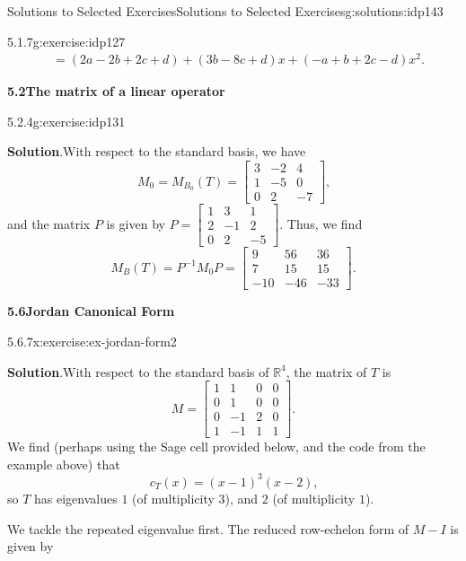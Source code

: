 \documentclass[oneside,10pt,]{book}
\newcommand{\blocktitlefont}{\relax}
\numberwithin{equation}{section}
\newcommand{\bbm}{\begin{bmatrix}}
\newcommand{\ebm}{\end{bmatrix}}
\newcommand{\R}{\mathbb{R}}
\newcommand{\amp}{&}
\begin{document}
\begin{solutions-chapter}{Solutions to Selected Exercises}{}{Solutions to Selected Exercises}{}{}{g:solutions:idp143}
\begin{inlinesolution}{5.1.7}{}{g:exercise:idp127}
\begin{align*}
\amp = (2a-2b+2c+d)+(3b-8c+d)x+(-a+b+2c-d)x^2\text{.}
\end{align*}
%
\end{inlinesolution}%
\par\medskip
\noindent\textbf{\Large{}5.2\space\textperiodcentered\space{}The matrix of a linear operator}
\begin{inlinesolution}{5.2.4}{}{g:exercise:idp131}%
\par\smallskip%
\noindent\textbf{\blocktitlefont Solution}.\hypertarget{g:solution:idp178-back}{}\quad{}With respect to the standard basis, we have%
\begin{equation*}
M_0=M_{B_0}(T) = \bbm 3\amp -2\amp 4\\1\amp -5\amp 0\\0\amp 2\amp -7\ebm\text{,}
\end{equation*}
and the matrix \(P\) is given by \(P = \bbm 1\amp 3\amp 1\\2\amp -1\amp 2\\0\amp 2\amp-5\ebm\). Thus, we find%
\begin{equation*}
M_B(T)=P^{-1}M_0P=\bbm 9\amp 56\amp 36\\7\amp 15\amp 15\\-10\amp -46\amp -33\ebm\text{.}
\end{equation*}
%
\end{inlinesolution}%
\par\medskip
\noindent\textbf{\Large{}5.6\space\textperiodcentered\space{}Jordan Canonical Form}
\begin{inlinesolution}{5.6.7}{}{x:exercise:ex-jordan-form2}%
\par\smallskip%
\noindent\textbf{\blocktitlefont Solution}.\hypertarget{g:solution:idp179-back}{}\quad{}With respect to the standard basis of \(\R^4\), the matrix of \(T\) is%
\begin{equation*}
M = \bbm 1\amp 1\amp 0\amp 0\\0\amp 1\amp 0\amp 0\\0\amp -1\amp 2\amp 0\\1\amp -1\amp 1\amp 1\ebm\text{.}
\end{equation*}
We find (perhaps using the Sage cell provided below, and the code from the example above) that%
\begin{equation*}
c_T(x)=(x-1)^3(x-2)\text{,}
\end{equation*}
so \(T\) has eigenvalues \(1\) (of multiplicity \(3\)), and \(2\) (of multiplicity \(1\)).%
\par
We tackle the repeated eigenvalue first. The reduced row-echelon form of \(M-I\) is given by%

\end{inlinesolution}
\end{solutions-chapter}
\end{document}
